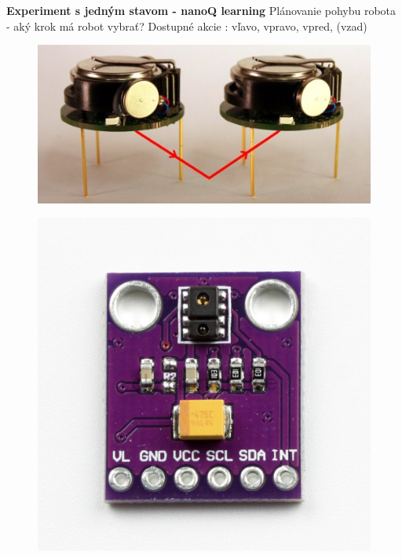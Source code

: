 \documentclass[xcolor=dvipsnames]{beamer}
\begin{document}
\begin{frame}{\bf Experiment s jedným stavom - nanoQ learning}
  Plánovanie pohybu robota - aký krok má robot vybrať?
  Dostupné akcie : vľavo, vpravo, vpred, (vzad)

  \begin{minipage}{.5\textwidth}

    \begin{figure}[!htb]
    \centering
    \includegraphics[scale=.3]{../pictures/kilobot.jpg}
    \end{figure}


    \end{minipage}%
  \begin{minipage}{.5\textwidth}

    \begin{figure}[!htb]
    \centering
    \includegraphics[scale=.1]{../pictures/apds9930.jpg}
    \end{figure}


\end{minipage}
\end{frame}
\end{document}
